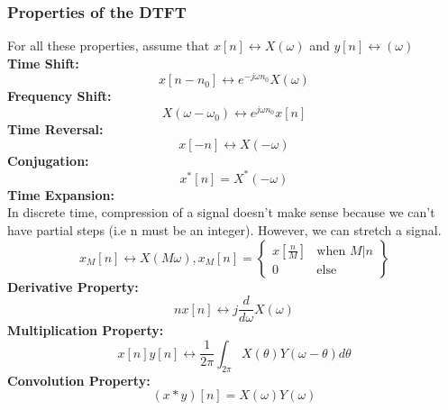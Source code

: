 \documentclass{article}
\begin{document}
\subsubsection{Properties of the DTFT}
For all these properties, assume that $x[n] \leftrightarrow X(\omega)$ and $y[n]\leftrightarrow (\omega)$\\
\textbf{Time Shift: }
$$ x[n-n_0] \leftrightarrow e^{-j\omega n_0}X(\omega)$$
\textbf{Frequency Shift: }
$$ X(\omega - \omega_0) \leftrightarrow e^{j\omega n_0}x[n]$$
\textbf{Time Reversal: }
$$ x[-n] \leftrightarrow X(-\omega)$$
\textbf{Conjugation: }
$$ x^*[n] = X^*(-\omega)$$
\textbf{Time Expansion: }\\
In discrete time, compression of a signal doesn't make sense because we can't have partial steps (i.e n must be an integer).
However, we can stretch a signal.
\[
    x_M[n] \leftrightarrow X(M\omega), x_M[n] = \left\{
        \begin{array}{cc}
            x[\frac{n}{M}] & \text{when } M | n\\
            0 & \text{else}
        \end{array}
    \right\}
\]
\textbf{Derivative Property: }
$$nx[n] \leftrightarrow j \frac{d}{d\omega}X(\omega)$$
\textbf{Multiplication Property: }
$$ x[n]y[n] \leftrightarrow \frac{1}{2\pi}\int_{2\pi}{X(\theta)Y(\omega-\theta)d\theta}$$
\textbf{Convolution Property: }
$$(x*y)[n] = X(\omega)Y(\omega)$$
\end{document}
